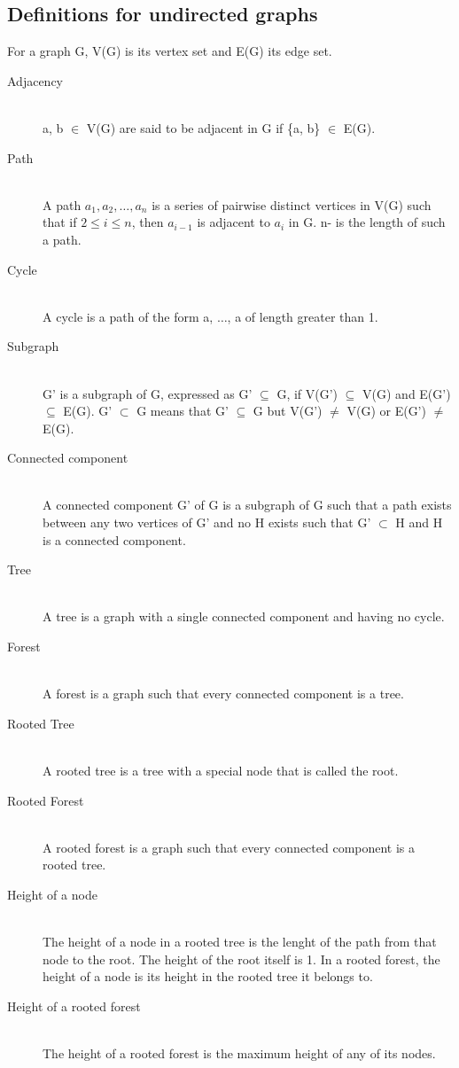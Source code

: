 \subsection{Definitions for undirected graphs}
For a graph G, V(G) is its vertex set and E(G) its edge set.
\begin{description}
 \item[Adjacency] \hfill \\
  a, b $\in$ V(G) are said to be adjacent in G if \{a, b\} $\in$ E(G).
 \item[Path] \hfill \\
  A path $a_1, a_2, \ldots, a_n$ is a series of pairwise distinct vertices in V(G) such that if $2 \leq i \leq n$, then $a_{i-1}$ is adjacent to $a_i$ in G. n- is the length of such a path.
 \item[Cycle] \hfill \\
  A cycle is a path of the form a, $\ldots$, a of length greater than 1.
 \item[Subgraph] \hfill \\
 G' is a subgraph of G, expressed as G' $\subseteq$ G, if V(G') $\subseteq$ V(G) and E(G') $\subseteq$ E(G). G' $\subset$ G means that G' $\subseteq$ G but V(G') $\neq$ V(G) or E(G') $\neq$ E(G).
 \item[Connected component] \hfill \\
  A connected component G' of G is a subgraph of G such that a path exists between any two vertices of G' and no H exists such that G' $\subset$ H and H is a connected component.
  \item[Tree] \hfill \\ 
  A tree is a graph with a single connected component and having no cycle.
  \item[Forest] \hfill \\
  A forest is a graph such that every connected component is a tree.
  \item[Rooted Tree] \hfill \\ 
  A rooted tree is a tree with a special node that is called the root.
  \item[Rooted Forest] \hfill \\ 
  A rooted forest is a graph such that every connected component is a rooted tree.
  \item[Height of a node] \hfill \\ 
  The height of a node in a rooted tree is the lenght of the path from that node to the root. The height of the root itself is 1. In a rooted forest, the height of a node is its height in the rooted tree it belongs to.
  \item[Height of a rooted forest] \hfill \\ 
  The height of a rooted forest is the maximum height of any of its nodes.
\end{description}

